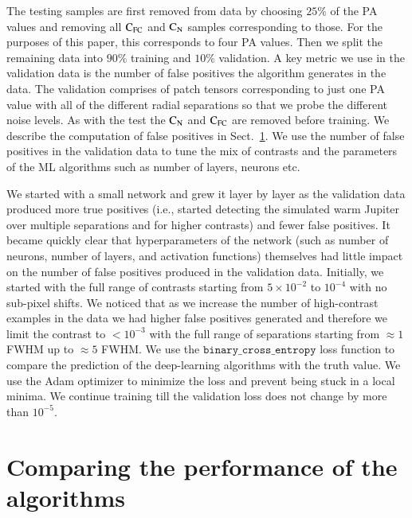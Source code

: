 \documentclass{aa}
\begin{document}
The testing samples are first removed from data by choosing $25\%$ of the PA values and removing all $\rm{C_{FC}}$ and $\rm{C_N}$ samples corresponding to those. 
For the purposes of this paper, this corresponds to four PA values.
Then we split the remaining data into $90\%$ training and $10\%$ validation.
A key metric we use in the validation data is the number of false positives the algorithm generates in the data. 
The validation comprises of patch tensors corresponding to just one PA value with all of the different radial separations so that we probe the different noise levels.
As with the test the $\rm{C_N}$ and $\rm{C_{FC}}$ are removed before training.
We describe the computation of false positives in Sect.~\ref{sec:results}.
We use the number of false positives in the validation data to tune the mix of contrasts and the parameters of the ML algorithms such as number of layers, neurons etc.

We started with a small network and grew it layer by layer as the validation data produced more true positives (i.e., started detecting the simulated warm Jupiter over multiple separations and for higher contrasts) and fewer false positives.
It became quickly clear that hyperparameters of the network (such as number of neurons, number of layers, and activation functions) themselves had little impact on the number of false positives produced in the validation data.
Initially, we started with the full range of contrasts starting from $5\times10^{-2}$ to $10^{-4}$ with no sub-pixel shifts.
We noticed that as we increase the number of high-contrast examples in the data we had higher false positives generated and therefore we limit the contrast to $<10^{-3}$ with the full range of separations starting from $\approx 1$ FWHM up to $\approx 5$ FWHM.
We use the $\texttt{binary\_cross\_entropy}$ loss function \citep{1993Li} to compare the prediction of the deep-learning algorithms with the truth value.
We use the Adam optimizer \citep{2014Adam} to minimize the loss and prevent being stuck in a local minima.
We continue training till the validation loss does not change by more than $10^{-5}$.



\section{Comparing the performance of the algorithms}\label{sec:results}
\end{document}
